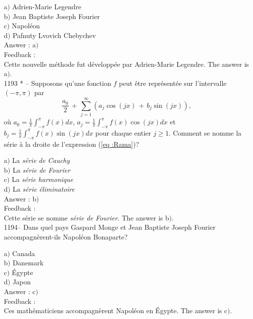 ﻿\documentclass[letterpaper, 12pt]{article}
\begin{document}
a$)$ Adrien-Marie Legendre \\
b$)$ Jean Baptiste Joseph Fourier \\
c$)$ Napol\'eon \\
d$)$ Pafnuty Lvovich Chebychev\\

Answer : a$)$\\

Feedback : \\
Cette nouvelle m\'ethode fut d\'evelopp\'ee par Adrien-Marie
Legendre.
The answer is a$)$.\\

1193 * -- Supposons qu'une fonction $f$ peut \^etre repr\'esent\'ee
sur l'intervalle $(-\pi,\pi)$ par
\begin{equation}
\label{eq :Rama}
\displaystyle{\frac{a_0}2\,+\,\sum_{j=1}^{\infty}(a_j\cos(jx)\,+\,b_j\sin(jx)),}
\end{equation}
o\`u $\displaystyle{a_0=\frac1{\pi}\int_{-\pi}^{\pi}f(x)dx}$,
$\displaystyle{a_j=\frac1{\pi}\int_{-\pi}^{\pi}f(x)\cos(jx)dx}$ et
$\displaystyle{b_j=\frac1{\pi}\int_{-\pi}^{\pi}f(x)\sin(jx)dx}$ pour
chaque entier $j\ge1$. Comment se nomme la s\'erie \`a la droite de
l'expression (\ref{eq :Rama})?

a$)$ La {\sl s\'erie de Cauchy} \\
b$)$ La {\sl s\'erie de Fourier} \\
c$)$ La {\sl s\'erie harmonique} \\
d$)$ La {\sl s\'erie \'eliminatoire}\\

Answer : b$)$\\

Feedback : \\
Cette s\'erie se nomme {\sl s\'erie de Fourier}.
The answer is b$)$.\\

1194-- Dans quel pays Gaspard Monge et Jean Baptiste Joseph Fourier
accompagn\`erent-ils Napol\'eon Bonaparte?

a$)$ Canada \\
b$)$ Danemark \\
c$)$ \'Egypte \\
d$)$ Japon\\

Answer : c$)$\\

Feedback : \\
Ces math\'ematiciens accompagn\`erent Napol\'eon en \'Egypte.
The answer is c$)$.\\
\end{document}
